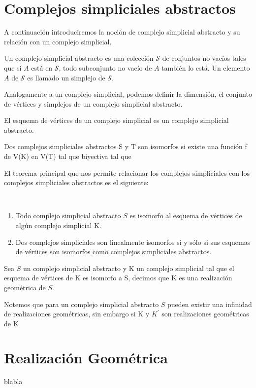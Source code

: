 \section{Complejos simpliciales abstractos}
A continuación introduciremos la noción de complejo simplicial abstracto y su relación con un complejo simplicial.
\begin{Defi}
Un complejo simplicial abstracto es una colección $\mathcal{S}$ de conjuntos no vacíos tales que si $A$ está en $\mathcal{S}$, todo subconjunto no vacío de $A$ también lo está. Un elemento $\textit{A}$ de $\mathcal{S}$ es llamado un simplejo de $\mathcal{S}$. 
\end{Defi}
Analogamente a un complejo simplicial, podemos definir la dimensión, el conjunto de vértices y simplejos de un complejo simplicial abstracto.
\begin{Ejem}
El esquema de vértices de un complejo simplicial es un complejo simplicial abstracto.
\end{Ejem}
\begin{Defi}
Dos complejos simpliciales abstractos S y T son isomorfos si existe una función f de V(K) en V(T) tal que biyectiva tal que 
\end{Defi}
El teorema principal que nos permite relacionar los complejos simpliciales con los complejos simpliciales abstractos es el siguiente:
\begin{Teo} 
~\begin{enumerate}
\item Todo complejo simplicial abstracto $S$ es isomorfo al esquema de vértices de algún complejo simplicial K.
\item Dos complejos simpliciales son linealmente isomorfos si y sólo si sus esquemas de vértices son isomorfos como complejos simpliciales abstractos.
\end{enumerate}
\end{Teo}

\begin{Defi}
Sea $S$ un complejo simplicial abstracto y K un complejo simplicial tal que el esquema de vértices de K es isomorfo a S, decimos que K es una realización geométrica de $S$.
\end{Defi}
Notemos que para un complejo simplicial abstracto $S$ pueden existir una infinidad de realizaciones geométricas, sin embargo si K y $K^{'}$ son realizaciones geométricas de K 

\section{Realización Geométrica}
blabla



